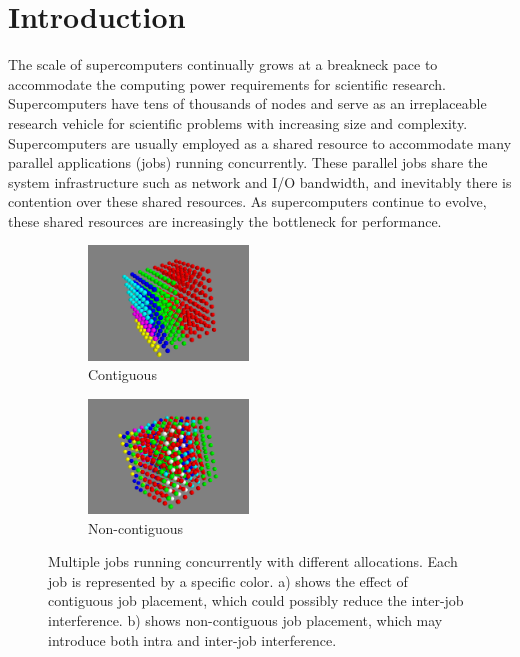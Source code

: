 
\section{Introduction} 
\label{sec: intro}

The scale of supercomputers continually grows at a breakneck pace to 
accommodate the computing power requirements for scientific research. 
Supercomputers have tens of thousands of nodes and serve as an irreplaceable 
research vehicle for scientific problems with increasing size and complexity. 
Supercomputers are usually employed as a shared resource to 
accommodate many parallel applications (jobs) running concurrently. 
These parallel jobs share the system infrastructure such as network and I/O bandwidth, 
and inevitably there is contention over these shared resources. 
As supercomputers continue to evolve, these shared resources are increasingly the bottleneck for performance.


\begin{figure}[h!]
    \centering
    \begin{subfigure}[t]{0.22\textwidth}
        \centering
        \includegraphics[height=1.2in]{figs/goodallocation}
        \caption{Contiguous}
        \label{fig:overview_sub1}
    \end{subfigure}%
    \hspace{1em}%
    \begin{subfigure}[t]{0.22\textwidth}
        \centering
        \includegraphics[height=1.2in]{figs/badallocation}
        \caption{Non-contiguous}
        \label{fig:overview_sub2}
    \end{subfigure}%
   \caption{Multiple jobs running concurrently with different allocations. 
   Each job is represented by a specific color. 
   a) shows the effect of contiguous job placement, 
   which could possibly reduce the inter-job interference. 
   b) shows non-contiguous job placement, 
   which may introduce both intra and inter-job interference. 
   }
   \label{fig:overview}
\end{figure}

